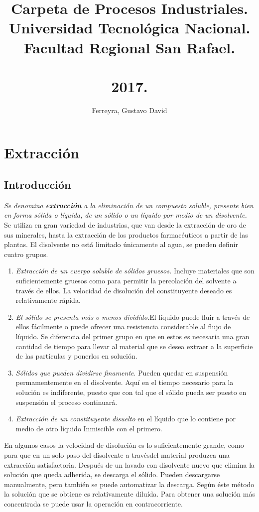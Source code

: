 \documentclass[12pt,openany]{book}
\title{Carpeta de Procesos Industriales.\\ Universidad Tecnológica Nacional.\\ Facultad Regional San Rafael.\\ \\ 2017.}
\author{Ferreyra, Gustavo David}
\begin{document}
\maketitle
\tableofcontents 
\chapter {Extracción}
\section{Introducción}

\textit{Se denomina\textbf{ extracción} a la eliminación de un compuesto soluble,
presente bien en forma sólida o líquida, de un sólido o un líquido 
 por medio de un disolvente.}  Se utiliza en gran variedad de industrias,
 que van desde la extracción de oro de sus minerales, hasta la extracción de los productos 
 farmacéuticos a partir de las plantas. El disolvente no está limitado únicamente al agua, se pueden definir
 cuatro grupos.

 \begin{enumerate}
    \item \textit{Extracción de un cuerpo soluble de sólidos gruesos.} Incluye materiales que son
    suficientemente gruesos como para permitir la percolación del solvente a través de ellos. La velocidad de 
    disolución del constituyente deseado es relativamente rápida.
    \item \textit{El sólido se presenta más o menos dividido.}El líquido puede fluir a través de ellos
    fácilmente o puede ofrecer una resistencia considerable al flujo de
    líquido. Se diferencia del primer grupo en que en estos es necesaria una gran cantidad de 
    tiempo para llevar al material que se desea extraer a la superficie de las
    partículas y ponerlos en solución.
    \item \textit{Sólidos que pueden dividirse finamente}. Pueden quedar en suspensión
    permamentemente en el disolvente. Aquí en el tiempo necesario
    para la solución es indiferente, puesto que con tal que el sólido
    pueda ser puesto en suspensión el proceso continuará.
    \item \textit{Extracción de un constituyente disuelto} en el líquido que lo contiene por medio
    de otro líquido Inmiscible con el primero. 
\end{enumerate}

En algunos casos la velocidad de disolución es lo suficientemente grande, como para que en un 
solo paso del disolvente a travésdel material produzca una extracción satisfactoria. Después
de un lavado con disolvente nuevo que elimina la solución que queda adherida, se descarga el sólido. Pueden
descargarse manualmente, pero también se puede automatizar la descarga. Según éste método
la solución que se obtiene es relativamente diluída. Para obtener una solución más concentrada se puede
usar la operación en contracorriente.
\end{document}
